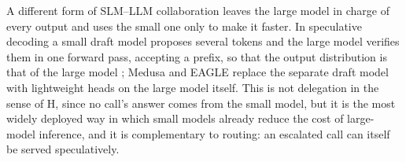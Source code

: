 A different form of SLM--LLM collaboration leaves the large model in charge of every output and uses the small one only to make it faster. In speculative decoding a small draft model proposes several tokens and the large model verifies them in one forward pass, accepting a prefix, so that the output distribution is that of the large model \citep{leviathan2023speculative,chen2023specsampling}; Medusa \citep{cai2024medusa} and EAGLE \citep{li2024eagle} replace the separate draft model with lightweight heads on the large model itself. This is not delegation in the sense of H, since no call's answer comes from the small model, but it is the most widely deployed way in which small models already reduce the cost of large-model inference, and it is complementary to routing: an escalated call can itself be served speculatively.

